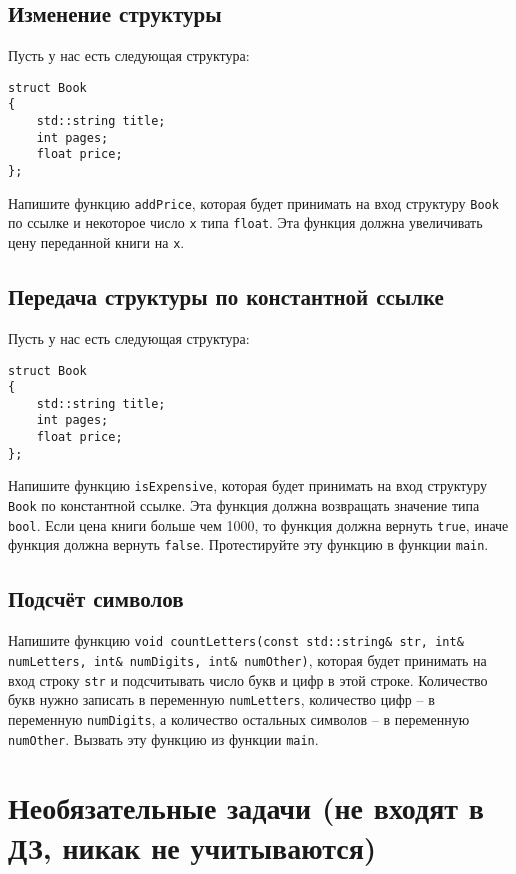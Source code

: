 \documentclass{article}
\begin{document}
\subsection{Изменение структуры}
Пусть у нас есть следующая структура:
\begin{lstlisting}
struct Book
{
    std::string title;
    int pages;
    float price;
};
\end{lstlisting}
Напишите функцию \texttt{addPrice}, которая будет принимать на вход структуру \texttt{Book} по ссылке и некоторое число \texttt{x} типа \texttt{float}. Эта функция должна увеличивать цену переданной книги на \texttt{x}.


\subsection{Передача структуры по константной ссылке}
Пусть у нас есть следующая структура:
\begin{lstlisting}
struct Book
{
    std::string title;
    int pages;
    float price;
};
\end{lstlisting}

Напишите функцию \texttt{isExpensive}, которая будет принимать на вход структуру \texttt{Book} по константной ссылке. Эта функция должна возвращать значение типа \texttt{bool}. Если цена книги больше чем 1000, то функция должна вернуть \texttt{true}, иначе функция должна вернуть \texttt{false}. Протестируйте эту функцию в функции \texttt{main}.



\subsection{Подсчёт символов}
Напишите функцию \texttt{void countLetters(const std::string\& str, int\& numLetters, int\& numDigits, int\& numOther)}, которая будет принимать на вход строку \texttt{str} и подсчитывать число букв и цифр в этой строке. Количество букв нужно записать в переменную \texttt{numLetters}, количество цифр -- в переменную \texttt{numDigits}, а количество остальных символов -- в переменную \texttt{numOther}. Вызвать эту функцию из функции \texttt{main}.


\newpage
\section*{Необязательные задачи (не входят в ДЗ, никак не учитываются)}
\setcounter{subsection}{0}
\end{document}
